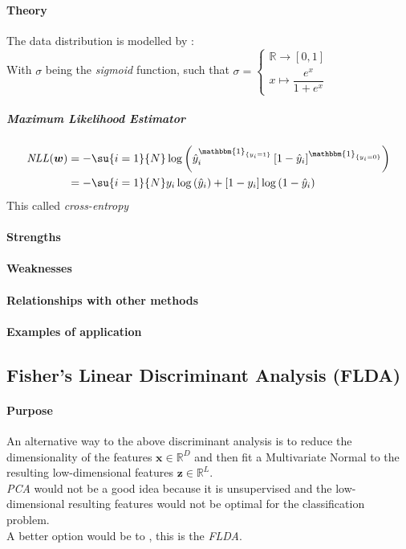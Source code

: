 \paragraph{Theory}
The data distribution is modelled by : 
\\
With $\sigma$ being the \emph{sigmoid} function, such that 
$\sigma = \begin{cases}
    \mathbb{R} \longrightarrow [0, 1]\\ 
    x \mapsto \dfrac{e^{x}}{1 + e^{x}}
\end{cases}
$
\subparagraph{Maximum Likelihood Estimator}
\begin{align*}
    \text{\emph{NLL}}(\bm{w})
    &= -\su{i=1}{N}\log\left(\hat{y}_{i}^{\mathbbm{1}_{\{y_{i} = 1\}}}\left[1 -
    \hat{y}_{i}\right]^{\mathbbm{1}_{\{y_{i}=0\}}}\right)\\ 
    &= -\su{i=1}{N}y_{i}\log\left(\hat{y}_{i}\right) + \left[1 -y_{i}\right]\log
    \left(1 -\hat{y}_{i}\right)
\end{align*}
This called \textit{cross-entropy}


\paragraph{Strengths}
\paragraph{Weaknesses}
\paragraph{Relationships with other methods}
\paragraph{Examples of application}

\subsection{Fisher's Linear Discriminant Analysis (FLDA)}
\paragraph{Purpose}
An alternative way to the above discriminant analysis is to reduce the dimensionality
of the features $\bm{x}\in\mathbb{R}^{D}$ and then fit a Multivariate Normal to the 
resulting low-dimensional features $\bm{z}\in \mathbb{R}^{L}$.\\
\emph{PCA} would not be a good idea because it is unsupervised and the low-dimensional
resulting features would not be optimal for the classification problem.\\
A better option would be to , this is the \emph{FLDA}.
